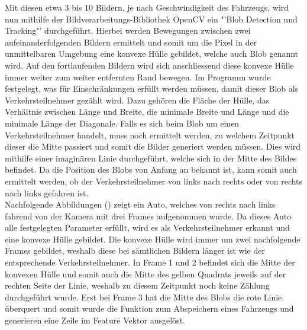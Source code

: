 Mit diesen etwa 3 bis 10 Bildern, je nach Geschwindigkeit des Fahrzeugs, wird nun mithilfe der Bildverarbeitungs-Bibliothek OpenCV ein "'Blob Detection und Tracking"' durchgeführt. Hierbei werden Bewegungen zwischen zwei aufeinanderfolgenden Bildern ermittelt und somit um die Pixel in der unmittelbaren Umgebung eine konvexe Hülle gebildet, welche auch Blob genannt wird. Auf den fortlaufenden Bildern wird sich anschliessend diese konvexe Hülle immer weiter zum weiter entfernten Rand bewegen. Im Programm wurde festgelegt, was für Einschränkungen erfüllt werden müssen, damit dieser Blob als Verkehrsteilnehmer gezählt wird. Dazu gehören die Fläche der Hülle, das Verhältnis zwischen Länge und Breite, die minimale Breite und Länge und die minimale Länge der Diagonale. Falls es sich beim Blob um einen Verkehrsteilnehmer handelt, muss noch ermittelt werden, zu welchem Zeitpunkt dieser die Mitte passiert und somit die Bilder generiert werden müssen. Dies wird mithilfe einer imaginären Linie durchgeführt, welche sich in der Mitte des Bildes befindet. Da die Position des Blobs von Anfang an bekannt ist, kann somit auch ermittelt werden, ob der Verkehrsteilnehmer von links nach rechts oder von rechts nach links gefahren ist.\\
Nachfolgende Abbildungen () zeigt ein Auto, welches von rechts nach links fahrend von der Kamera mit drei Frames aufgenommen wurde. Da dieses Auto alle festgelegten Parameter erfüllt, wird es als Verkehrsteilnehmer erkannt und eine konvexe Hülle gebildet. Die konvexe Hülle wird immer um zwei nachfolgende Frames gebildet, weshalb diese bei sämtlichen Bildern länger ist wie der entsprechende Verkehrsteilnehmer. In Frame 1 und 2 befindet sich die Mitte der konvexen Hülle und somit auch die Mitte des gelben Quadrats jeweils auf der rechten Seite der Linie, weshalb zu diesem Zeitpunkt noch keine Zählung durchgeführt wurde. Erst bei Frame 3 hat die Mitte des Blobs die rote Linie überquert und somit wurde die Funktion zum Abspeichern eines Fahrzeugs und generieren eine Zeile im Feature Vektor ausgelöst.

